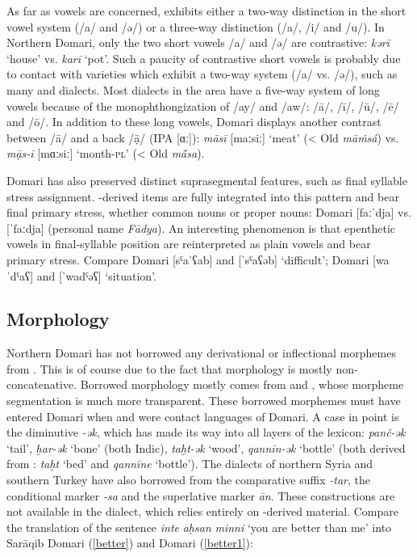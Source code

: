 \documentclass[output=paper]{langsci/langscibook}
\begin{document}
As far as vowels are concerned,   exhibits either a two-way distinction in the short vowel system (/a/ and /ə/) or a three-way distinction (/a/, /i/ and /u/). In Northern Domari, only the two short vowels /a/ and /ə/ are contrastive: \textit{kərī} ‘house’ vs. \textit{karī} ‘pot’. Such a paucity of contrastive short vowels is probably due to contact with  varieties which exhibit a two-way system (/a/ vs. /ə/), such as many  and  dialects. Most  dialects in the area have a five-way system of long vowels because of the monophthongization of /ay/ and /aw/: /ā/, /ī/, /ū/, /ē/ and /ō/. In addition to these long vowels, Domari displays another contrast between /ā/ and a back /ạ̄/ (IPA [ɑː]): \textit{māsī} [maːsiː] ‘meat’ (< Old  \textit{māṁsá})  vs. \textit{mạ̄s-ī} [mɑːsiː] ‘month-\textsc{pl}’ (< Old  \textit{mā́sa}).

Domari has also preserved distinct suprasegmental features, such as final syllable {stress} assignment. -derived items are fully integrated into this pattern and bear final primary {stress}, whether common nouns or proper nouns: Domari [faːˈdja] vs.  [ˈfaːdja] (personal name \textit{Fādya}). An interesting phenomenon is that  epenthetic vowels in final-syllable position are reinterpreted as plain vowels and bear primary {stress}.  Compare Domari [sˤaˈʕab] and  [ˈsˤaʕəb] ‘difficult’; Domari [waˈdˤaʕ] and  [ˈwadˤəʕ] ‘situation’.


 
\subsection{Morphology}\largerpage
Northern Domari has not borrowed any {derivational} or {inflectional} morphemes from . This is of course due to the fact that  morphology is mostly {non-concatenative}. Borrowed morphology mostly comes from  and , whose morpheme segmentation is much more transparent. These borrowed morphemes must have entered Domari when  and  were contact languages of Domari. A case in point is the  {diminutive} \textit{-ək}, which has made its way into all layers of the lexicon: \textit{panč-ək} ‘tail’, \textit{ḫar-ək} ‘bone’ (both Indic), \textit{taḫt-ək} ‘wood’, \textit{qannīn-ək} ‘bottle’ (both derived from : \textit{taḫt} ‘bed’ and \textit{qannīne} ‘bottle’). The dialects of northern Syria and southern Turkey have also borrowed from  the {comparative} suffix \textit{{}-tar}, the  {conditional} marker \textit{{}-sa} and the  {superlative} marker \textit{ān}. These constructions are not available in the  dialect, which relies entirely on -derived material. Compare the translation of the  sentence \textit{inte} \textit{aḥsan} \textit{minni} ‘you are better than me’ into Sarāqib Domari (\ref{better}) and  Domari (\ref{better1}):
\end{document}
